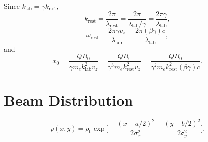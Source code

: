 \documentclass[11pt,oneside]{article}
\begin{document}
Since $k_{\text{lab}} = \gamma k_{\text{rest}}$,
\begin{equation}
  k_{\text{rest}}
= \frac{2\pi}{\lambda_{\text{rest}}}
= \frac{2\pi}{\lambda_{\text{lab}} / \gamma}
= \frac{2\pi \gamma}{\lambda_{\text{lab}}} ,
\end{equation}
\begin{equation}
  \omega_{\text{rest}}
= \frac{2\pi \gamma v_{z}}{\lambda_{\text{lab}}}
= \frac{2\pi (\beta \gamma) c}{\lambda_{\text{lab}}} ,
\end{equation}
and
\begin{equation}
  x_{0}
= \frac{Q B_{0}}{\gamma m_{e} k_{\text{lab}}^{2} v_{z}}
= \frac{Q B_{0}}{\gamma^{3} m_{e} k_{\text{rest}}^{2} v_{z}}
= \frac{Q B_{0}}{\gamma^{2} m_{e} k_{\text{rest}}^{2} (\beta \gamma) c} .
\end{equation}

\clearpage
\section{Beam Distribution}

\begin{equation}
  \rho (x,y) 
 =  \rho_{0}
    \exp \Bigg[
       - \frac{ \left( x - a/2 \right)^{2} }{ 2\sigma_{x}^{2}}
       - \frac{ \left( y - b/2 \right)^{2} }{ 2\sigma_{y}^{2}}
         \Bigg] . 
\end{equation}
\end{document}
